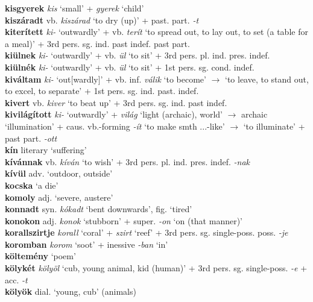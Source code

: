 \documentclass[11pt]{article}
\begin{document}
\textbf{kisgyerek} \emph{kis} `small' + \emph{gyerek} `child' \\
\textbf{kiszáradt} vb. \emph{kiszárad} `to dry (up)' +
past. part. \emph{-t} \\
\textbf{kiterített} \emph{ki-} `outwardly' +
vb. \emph{terít} `to spread out, to lay out, to set (a table for a
meal)' + 3rd pers. sg. ind. past indef. \textbar\textbar{} past part. \\
\textbf{kiülnek} \emph{ki-} `outwardly' + vb. \emph{ül}
`to sit' + 3rd pers. pl. ind. pres. indef. \\
\textbf{kiülnék} \emph{ki-} `outwardly' + vb. \emph{ül}
`to sit' + 1st pers. sg. cond. indef. \\
\textbf{kiváltam}  \emph{ki-} `out[wardly]' + vb. inf. \emph{válik} `to
become' $\rightarrow$ `to leave, to stand out, to excel, to separate'
+ 1st pers. sg. ind. past. indef. \\
\textbf{kivert} vb. \emph{kiver} `to beat up' + 3rd
pers. sg. ind. past indef. \\
\textbf{kivilágított} \emph{ki-} `outwardly' + \emph{világ}
`light (archaic), world' $\rightarrow$ archaic `illumination' +
    caus. vb.-forming \emph{-ít} `to make smth ...-like' $\rightarrow$
`to illuminate' + past part. \emph{-ott} \\
\textbf{kín} literary `suffering' \\
\textbf{kívánnak} vb. \emph{kíván} `to wish' + 3rd
pers. pl. ind. pres. indef. \emph{-nak} \\
\textbf{kívül} adv. `outdoor, outside' \\
\textbf{kocska} `a die' \\
\textbf{komoly} adj. `severe, austere' \\
\textbf{konnadt} syn. \emph{kókadt} `bent downwards', fig. `tired' \\
\textbf{konokon} adj. \emph{konok} `stubborn' + super. \emph{-on}
`on (that manner)' \\
\textbf{korallszirtje} \emph{korall} `coral' + \emph{szirt} `reef' + 3rd
pers. sg. single\hyp{}poss. poss. \emph{-je} \\
\textbf{koromban} \emph{korom} `soot' + inessive \emph{-ban}
`in' \\
\textbf{költemény} `poem' \\
\textbf{kölykét} \emph{kölyöl} `cub, young animal, kid (human)'
+ 3rd pers. sg. single\hyp{}poss. \emph{-e} + acc. \emph{-t} \\
\textbf{kölyök} dial. `young, cub' (animals) \textbar\textbar{}
\end{document}
